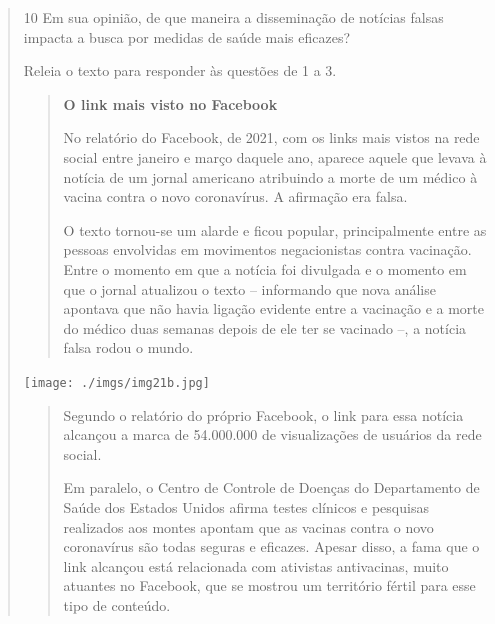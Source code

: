 \begin{quote}


\num{10} Em sua opinião, de que maneira a disseminação de notícias falsas
impacta a busca por medidas de saúde mais eficazes?



Releia o texto para responder às questões de 1 a 3.\medskip

\begin{minipage}{.5\textwidth}
\begin{quote}
\textbf{O link mais visto no Facebook}

No relatório do Facebook, de 2021, com os links mais vistos na rede social
entre janeiro e março daquele ano, aparece aquele que levava à notícia
de um jornal americano atribuindo a morte de um médico à vacina contra
o novo coronavírus. A afirmação era falsa.

O texto tornou-se um alarde e ficou popular, principalmente entre as pessoas
envolvidas em movimentos negacionistas contra vacinação. Entre o momento em
que a notícia foi divulgada e o momento em que o jornal atualizou o texto --
informando que nova análise apontava que não havia ligação evidente entre a
vacinação e a morte do médico duas semanas depois de ele ter se vacinado --,
a notícia falsa rodou o mundo.
\end{quote}
\end{minipage}\hspace{1cm}
\begin{minipage}{.5\textwidth}
\texttt{[image: ./imgs/img21b.jpg]}
\end{minipage}

\begin{quote}
Segundo o relatório do próprio Facebook, o link para essa notícia alcançou
a marca de 54.000.000 de visualizações de usuários da rede social.

Em paralelo, o Centro de Controle de Doenças do Departamento de Saúde dos Estados
Unidos afirma testes clínicos e pesquisas realizados aos montes apontam que as
vacinas contra o novo coronavírus são todas seguras e eficazes. Apesar disso, a
fama que o link alcançou está relacionada com ativistas antivacinas, muito atuantes
no Facebook, que se mostrou um território fértil para esse tipo de conteúdo.


\end{quote}
\end{quote}
